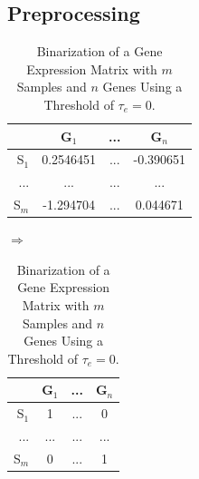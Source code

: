 \documentclass[10pt, conference, compsocconf]{IEEEtran}
\begin{document}

\subsection{Preprocessing}
\label{sec:preprocessing}


\begin{table}
\centering
    \begin{tabular}{r|c|c|c}
         & G$_1$ & ... & G$_n$ \\ \hline
        S$_1$	        & 0.2546451 & ... & -0.390651\\
        ...	        & ... & ... & ...\\
        S$_m$	        & -1.294704 & ... & 0.044671\\
    \end{tabular}
    $\Rightarrow$
    \begin{tabular}{r|c|c|c}
         & G$_1$ & ... & G$_n$ \\ \hline
        S$_1$	        & 1 & ... & 0\\
        ...	        & ... & ... & ...\\
        S$_m$	        & 0 & ... & 1\\
    \end{tabular}
    \caption{Binarization of a Gene Expression Matrix with $m$ Samples and $n$ Genes Using a Threshold of $\tau_e=0$.}
    \label{tab:binarization}
\end{table}
\end{document}
